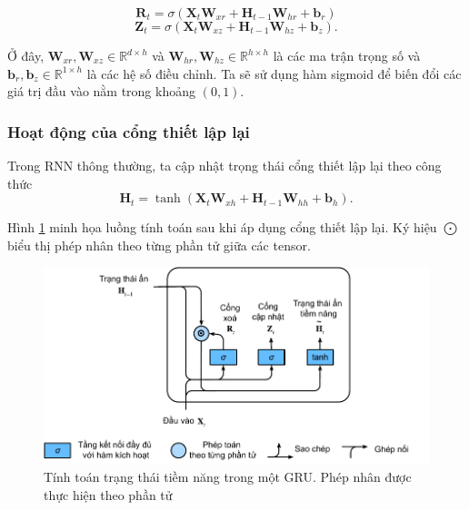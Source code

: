 \documentclass[conference]{IEEEtran}
\begin{document}
\begin{equation*}
    \mathbf{R}_t = \sigma(\mathbf{X}_t \mathbf{W}_{xr} + \mathbf{H}_{t-1} \mathbf{W}_{hr} + \mathbf{b}_r)
\end{equation*}
\begin{equation*}
    \mathbf{Z}_t = \sigma(\mathbf{X}_t \mathbf{W}_{xz} + \mathbf{H}_{t-1} \mathbf{W}_{hz} + \mathbf{b}_z).
\end{equation*}

Ở đây, $\mathbf{W}_{xr}, \mathbf{W}_{xz} \in \mathbb{R}^{d \times h}$ và $\mathbf{W}_{hr}, \mathbf{W}_{hz} \in \mathbb{R}^{h \times h}$ là các ma trận trọng số và $\mathbf{b}_r, \mathbf{b}_z \in \mathbb{R}^{1 \times h}$ là các hệ số điều chỉnh. Ta sẽ sử dụng hàm sigmoid để biến đổi các giá trị đầu vào nằm trong khoảng $(0, 1)$.

\subsubsection{Hoạt động của cổng thiết lập lại}
Trong RNN thông thường, ta cập nhật trọng thái cổng thiết lập lại theo công thức
\[
    \mathbf{H}_t = \tanh(\mathbf{X}_t \mathbf{W}_{xh} + \mathbf{H}_{t-1} \mathbf{W}_{hh} + \mathbf{b}_h).
\]

Hình \ref{fig:gru_del} minh họa luồng tính toán sau khi áp dụng cổng thiết lập lại. Ký hiệu \(\bigodot\) biểu thị phép nhân theo từng phần tử giữa các tensor.

\begin{figure}[H]
    \centering
    \begin{minipage}{0.23\textwidth}
        \centering
        \includegraphics[width=1\textwidth]{bibliography/figure/GRU/gru_2.pdf}
        \caption{Tính toán trạng thái tiềm năng trong một GRU. Phép nhân được thực hiện theo phần tử}
        \label{fig:gru_del}
    \end{minipage}

\end{figure}
\end{document}
